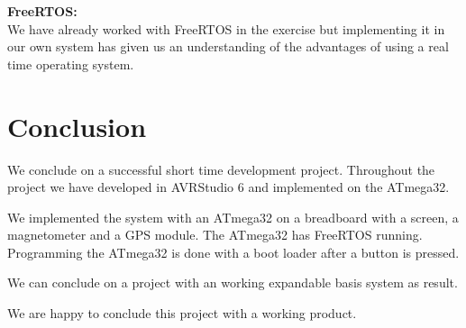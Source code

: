 \textbf{FreeRTOS:}\\
We have already worked with FreeRTOS in the exercise but implementing it in our own system has given us an understanding of the advantages of using a real time operating system. 





\chapter{Conclusion}
We conclude on a successful short time development project. Throughout the project we have developed in AVRStudio 6 and implemented on the ATmega32. 

We implemented the system with an ATmega32 on a breadboard with a screen, a magnetometer and a GPS module. The ATmega32 has FreeRTOS running. Programming the ATmega32 is done with a boot loader after a button is pressed.

We can conclude on a project with an working expandable basis system as result.

We are happy to conclude this project with a working product.

